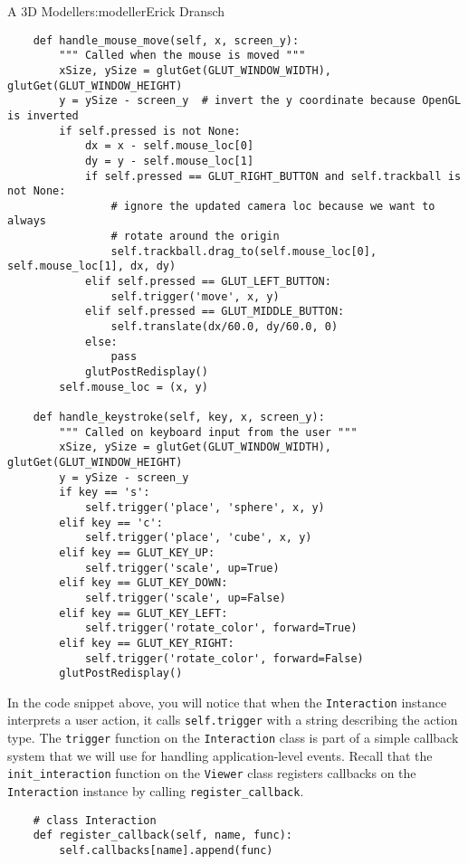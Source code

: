\begin{aosachapter}{A 3D Modeller}{s:modeller}{Erick Dransch}
\begin{verbatim}
    def handle_mouse_move(self, x, screen_y):
        """ Called when the mouse is moved """
        xSize, ySize = glutGet(GLUT_WINDOW_WIDTH), glutGet(GLUT_WINDOW_HEIGHT)
        y = ySize - screen_y  # invert the y coordinate because OpenGL is inverted
        if self.pressed is not None:
            dx = x - self.mouse_loc[0]
            dy = y - self.mouse_loc[1]
            if self.pressed == GLUT_RIGHT_BUTTON and self.trackball is not None:
                # ignore the updated camera loc because we want to always
                # rotate around the origin
                self.trackball.drag_to(self.mouse_loc[0], self.mouse_loc[1], dx, dy)
            elif self.pressed == GLUT_LEFT_BUTTON:
                self.trigger('move', x, y)
            elif self.pressed == GLUT_MIDDLE_BUTTON:
                self.translate(dx/60.0, dy/60.0, 0)
            else:
                pass
            glutPostRedisplay()
        self.mouse_loc = (x, y)

    def handle_keystroke(self, key, x, screen_y):
        """ Called on keyboard input from the user """
        xSize, ySize = glutGet(GLUT_WINDOW_WIDTH), glutGet(GLUT_WINDOW_HEIGHT)
        y = ySize - screen_y
        if key == 's':
            self.trigger('place', 'sphere', x, y)
        elif key == 'c':
            self.trigger('place', 'cube', x, y)
        elif key == GLUT_KEY_UP:
            self.trigger('scale', up=True)
        elif key == GLUT_KEY_DOWN:
            self.trigger('scale', up=False)
        elif key == GLUT_KEY_LEFT:
            self.trigger('rotate_color', forward=True)
        elif key == GLUT_KEY_RIGHT:
            self.trigger('rotate_color', forward=False)
        glutPostRedisplay()
\end{verbatim}

\label{internal-callbacks}

In the code snippet above, you will notice that when the
\texttt{Interaction} instance interprets a user action, it calls
\texttt{self.trigger} with a string describing the action type. The
\texttt{trigger} function on the \texttt{Interaction} class is part of a
simple callback system that we will use for handling application-level
events. Recall that the \texttt{init\_interaction} function on the
\texttt{Viewer} class registers callbacks on the \texttt{Interaction}
instance by calling \texttt{register\_callback}.

\begin{verbatim}
    # class Interaction
    def register_callback(self, name, func):
        self.callbacks[name].append(func)
\end{verbatim}


\end{aosachapter}
